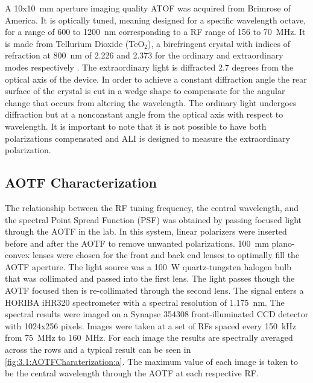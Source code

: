 \documentclass[12pt]{article}
\begin{document}
A 10x10~mm aperture imaging quality ATOF was acquired from Brimrose of America. It is optically tuned, meaning designed for a specific wavelength octave, for a range of 600 to 
1200~nm corresponding to a RF range of 156 to 70~MHz. It is made from Tellurium Dioxide (TeO$_{2}$), a birefringent crystal with indices of refraction at 800~nm of 2.226 and 
2.373 for the ordinary and extraordinary modes respectively \citep{Uchida1971}. The extraordinary light is diffracted 2.7 degrees from the optical axis of the device. In order 
to achieve a constant diffraction angle the rear surface of the crystal is cut in a wedge shape to compensate for the angular change that occurs from altering the wavelength. 
The ordinary light undergoes diffraction but at a nonconstant angle from the optical axis with respect to wavelength. It is important to note that it is not possible to have 
both polarizations compensated and ALI is designed to measure the extraordinary polarization.

\subsection{AOTF Characterization}

The relationship between the RF tuning frequency, the central wavelength, and the spectral Point Spread Function (PSF) was obtained by passing focused light through the AOTF in 
the lab. In this system, linear polarizers were inserted before and after the AOTF to remove unwanted polarizations. 100~mm plano-convex lenses were chosen for the front and 
back end lenses to optimally fill the AOTF aperture. The light source was a 100~W quartz-tungsten halogen bulb that was collimated and passed into the first lens. The light 
passes though the AOTF focused then is re-collimated through the second lens. The signal enters a HORIBA iHR320 spectrometer with a spectral resolution of 1.175~nm. The spectral 
results were imaged on a Synapse 354308 front-illuminated CCD detector with 1024x256 pixels. Images were taken at a set of RFs spaced every 150~kHz from 75~MHz to 160~MHz. For 
each image the results are spectrally averaged across the rows and a typical result can be seen in \autoref{fig:3.1:AOTFCharaterization:a}. The maximum value of each image is 
taken to be the central wavelength through the AOTF at each respective RF.
\end{document}
